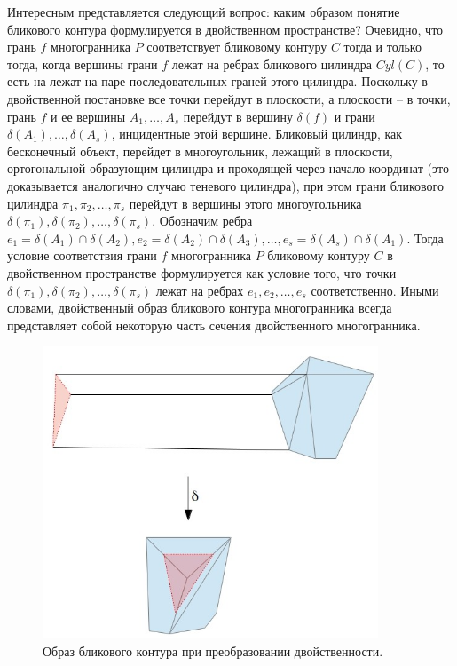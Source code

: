 \documentclass[a4paper, 12pt, titlepage]{article}
\theoremstyle{definition}
\theoremstyle{plain}
\theoremstyle{plain}
\begin{document}
Интересным представляется следующий вопрос: каким образом понятие бликового
контура формулируется в двойственном пространстве? Очевидно, что грань $f$
многогранника $P$ соответствует бликовому контуру $C$ тогда  и только тогда,
когда вершины грани $f$ лежат на ребрах бликового цилиндра $Cyl(C)$, то есть
на лежат на паре последовательных граней этого цилиндра. Поскольку в
двойственной постановке все точки перейдут в плоскости, а плоскости -- в точки,
грань $f$ и ее вершины $A_{1}, \ldots, A_{s}$ перейдут в вершину $\delta(f)$ и
грани $\delta(A_{1}), \ldots, \delta(A_{s})$, инцидентные этой вершине.
Бликовый цилиндр, как бесконечный объект, перейдет в многоугольник, лежащий в
плоскости, ортогональной образующим цилиндра и проходящей через начало координат
(это доказывается аналогично случаю теневого цилиндра), при этом грани бликового
цилиндра $\pi_{1}, \pi_{2}, \ldots, \pi_{s}$ перейдут в вершины этого
многоугольника $\delta(\pi_{1}), \delta(\pi_{2}), \ldots, \delta(\pi_{s})$.
Обозначим ребра $e_{1} = \delta(A_{1}) \cap \delta(A_{2}),
e_{2} = \delta(A_{2}) \cap \delta(A_{3}), \ldots,
e_{s} = \delta(A_{s}) \cap \delta(A_{1})$. Тогда условие соответствия грани $f$
многогранника $P$ бликовому контуру $C$ в двойственном пространстве
формулируется как условие того, что точки
$\delta(\pi_{1}), \delta(\pi_{2}), \ldots, \delta(\pi_{s})$ лежат на ребрах
$e_{1}, e_{2}, \ldots, e_{s}$ соответственно. Иными словами, двойственный образ
бликового контура многогранника всегда представляет собой некоторую часть
сечения двойственного многогранника.

\begin{figure}[ht]
 \includegraphics[width=10cm]{images/BlinkContourDual.jpg}
 \caption{Образ бликового контура при преобразовании двойственности.}
 \label{BlinkContourDual}
\end{figure}
\end{document}
